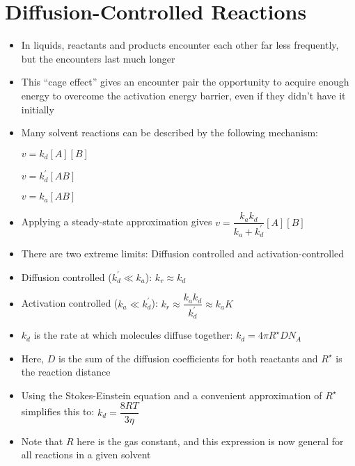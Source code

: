 \documentclass[12pt, openany, letterpaper]{memoir}
\begin{document}
\section{Diffusion-Controlled Reactions}
\begin{itemize}
	\item In liquids, reactants and products encounter each other far less frequently, but the encounters last much longer
	\item This “cage effect” gives an encounter pair the opportunity to acquire enough energy to overcome the activation energy barrier, even if they didn't have it initially
	\item Many solvent reactions can be described by the following mechanism:
	
	 \hspace{2em} $v=k_d[A][B]$
	
	 \hspace{2em} $v=k^\prime_d[AB]$
	
	 \hspace{2em} $v=k_a[AB]$
	\item Applying a steady-state approximation gives $v=\dfrac{k_ak_d}{k_a+k_d^\prime}[A][B]$
	\item There are two extreme limits: Diffusion controlled and activation-controlled
	\item Diffusion controlled ($k^\prime_d\ll k_a$): $k_r\approx k_d$
	\item Activation controlled ($k_a\ll k^\prime_d$): $k_r\approx\dfrac{k_ak_d}{k^\prime_d}\approx k_aK$
	\item $k_d$ is the rate at which molecules diffuse together: $k_d=4\pi R^{\star}DN_A$
	\item Here, $D$ is the sum of the diffusion coefficients for both reactants and $R^{\star}$ is the reaction distance
	\item Using the Stokes-Einstein equation and a convenient approximation of $R^{\star}$ simplifies this to: $k_d=\dfrac{8RT}{3\eta}$
	\item Note that $R$ here is the gas constant, and this expression is now general for all reactions in a given solvent
\end{itemize}
\end{document}
